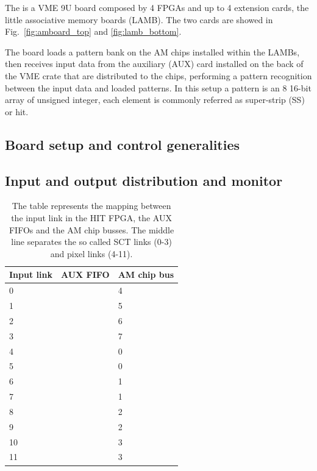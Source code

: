 The \AMBoard is a VME 9U board composed by 4 FPGAs and up to 4 extension cards,
the little associative memory boards (LAMB). The two cards are showed in 
Fig.~\ref{fig:amboard_top} and \ref{fig:lamb_bottom}.

The board loads a pattern
bank on the AM chips installed within the LAMBs, then receives input data
from the auxiliary (AUX) card installed on the back of the VME crate that are
distributed to the chips, performing a pattern recognition between the 
input data and loaded patterns. In this setup a pattern is an 8 16-bit array
of unsigned integer, each element is commonly referred as super-strip (SS)
or hit. 

\subsection{Board setup and control generalities}

\subsection{Input and output distribution and monitor}

\begin{table}
	\centering
	\begin{tabular}{|l|l|l|}
	\hline
	\textbf{Input link} & \textbf{AUX FIFO}& \textbf{AM chip bus} \\
	\hline\hline
	0 & & 4 \\ 
	1 & & 5 \\ 
	2 & & 6 \\ 
	3 & & 7 \\
	\hline
	4 & & 0 \\
	5 & & 0 \\
	6 & & 1 \\
	7 & & 1 \\
	8 & & 2 \\
	9 & & 2 \\
	10 & & 3 \\
	11 & & 3 \\
	\hline
\end{tabular}

\caption{The table represents the mapping between the input link
	in the HIT FPGA, the AUX FIFOs and the AM chip busses. The middle line
	separates the so called SCT links (0-3) and pixel links (4-11).}
\label{tab:inputmap}
\end{table}

